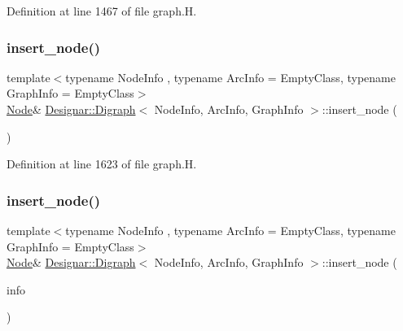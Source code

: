 Definition at line 1467 of file graph.\+H.

\mbox{\label{class_designar_1_1_digraph_a6ee69792c537ce241a2e448da1b46f1b}} 
\subsubsection{\texorpdfstring{insert\+\_\+node()}{insert\_node()}\hspace{0.1cm}{\footnotesize\ttfamily [2/4]}}
{\footnotesize\ttfamily template$<$typename Node\+Info , typename Arc\+Info  = Empty\+Class, typename Graph\+Info  = Empty\+Class$>$ \\
\hyperlink{class_designar_1_1_digraph_a4dc921c41a480b7946a04170e997d8ae}{Node}\& \hyperlink{class_designar_1_1_digraph}{Designar\+::\+Digraph}$<$ Node\+Info, Arc\+Info, Graph\+Info $>$\+::insert\+\_\+node (\begin{DoxyParamCaption}{ }\end{DoxyParamCaption})\hspace{0.3cm}{\ttfamily [inline]}}



Definition at line 1623 of file graph.\+H.

\mbox{\label{class_designar_1_1_digraph_a292dae36c1ee1fa581013c908ecebd1c}} 
\subsubsection{\texorpdfstring{insert\+\_\+node()}{insert\_node()}\hspace{0.1cm}{\footnotesize\ttfamily [3/4]}}
{\footnotesize\ttfamily template$<$typename Node\+Info , typename Arc\+Info  = Empty\+Class, typename Graph\+Info  = Empty\+Class$>$ \\
\hyperlink{class_designar_1_1_digraph_a4dc921c41a480b7946a04170e997d8ae}{Node}\& \hyperlink{class_designar_1_1_digraph}{Designar\+::\+Digraph}$<$ Node\+Info, Arc\+Info, Graph\+Info $>$\+::insert\+\_\+node (\begin{DoxyParamCaption}\item[{const Node\+Info \&}]{info }\end{DoxyParamCaption})\hspace{0.3cm}{\ttfamily [inline]}}



